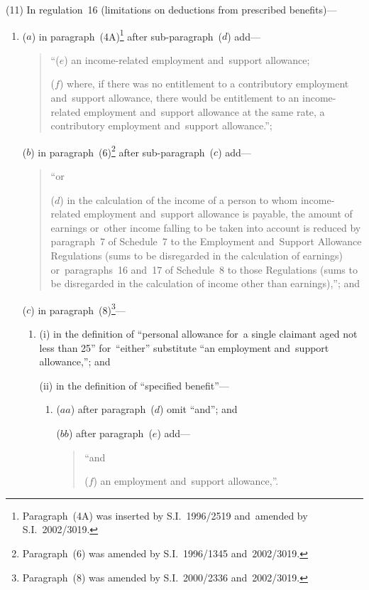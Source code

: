 \documentclass[12pt,a4paper]{article}
\begin{document}
(11) In regulation~16 (limitations on deductions from prescribed benefits)—
\begin{enumerate}\item[]
($a$) in paragraph~(4A)\footnote{Paragraph~(4A) was inserted by S.I.~1996/2519 and~amended by S.I.~2002/3019.} after sub-paragraph~($d$)  add—
\begin{quotation}
“($e$) an income-related employment and~support allowance;

($f$) where, if there was no entitlement to a contributory employment and~support allowance, there would be entitlement to an income-related employment and~support allowance at the same rate, a contributory employment and~support allowance.”;
\end{quotation}

($b$) in paragraph~(6)\footnote{Paragraph~(6) was amended by S.I.~1996/1345 and~2002/3019.} after sub-paragraph~($c$)  add—
\begin{quotation}
“or

($d$) in the calculation of the income of a person to whom income-related employment and~support allowance is payable, the amount of earnings or~other income falling to be taken into account is reduced by paragraph~7 of Schedule~7 to the Employment and~Support Allowance Regulations (sums to be disregarded in the calculation of earnings) or~paragraphs~16 and~17 of Schedule~8 to those Regulations (sums to be disregarded in the calculation of income other than earnings),”; and
\end{quotation}

($c$) in paragraph~(8)\footnote{Paragraph~(8) was amended by S.I.~2000/2336 and~2002/3019.}—
\begin{enumerate}\item[]
(i) in the definition of “personal allowance for~a single claimant aged not less than 25” for~“either” substitute “an employment and~support allowance,”; and

(ii) in the definition of “specified benefit”—
\begin{enumerate}\item[]
($aa$) after paragraph~($d$)  omit “and”; and

($bb$) after paragraph~($e$)  add—
\begin{quotation}
“and

($f$) an employment and~support allowance,”.
\end{quotation}
\end{enumerate}
\end{enumerate}
\end{enumerate}
\end{document}
